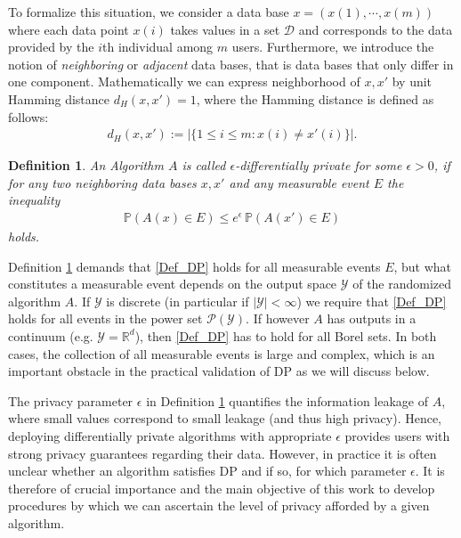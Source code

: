 \documentclass[conference]{IEEEtran}
\newtheorem{definition}{Definition}
\begin{document}
To formalize this situation, we consider a data base $x = (x(1), \cdots, x(m))$ where each data point $x(i)$ takes values in a set $ \mathcal{D}$ and corresponds to the data provided by the $i$th individual among $m$ users. 
Furthermore, we introduce the notion of \textit{neighboring} or \textit{adjacent} data bases, that is data bases that only differ in one component. Mathematically we can express neighborhood of $x,x'$ by unit Hamming distance $d_H(x,x')=1$, where the Hamming distance is defined as follows:
\begin{align*}
d_H(x,x') := \vert \{ 1 \leq i \leq m: x(i) \neq x'(i) \} \vert.
\end{align*}


\begin{definition} \label{def_privacy}
An Algorithm $A$ is called $\epsilon$-differentially private for some $\epsilon>0$, if for any two neighboring data bases $x,x'$ and any measurable event $ E $ the inequality
\begin{align}
\mathbb{P}(A(x) \in E) \leq e^{\epsilon} \, \mathbb{P}(A(x') \in E) \label{Def_DP}
\end{align}
holds.
\end{definition}
Definition \ref{def_privacy} demands that \eqref{Def_DP} holds for all measurable events $E$, but what constitutes a measurable event depends on the output space $\mathcal{Y}$ of the randomized algorithm $A$. If $\mathcal{Y}$ is discrete (in particular if $|\mathcal{Y}|<\infty$) we require that \eqref{Def_DP} holds for all events in the power set $\mathcal{P}(\mathcal{Y})$. If however $A$ has outputs in a continuum (e.g. $\mathcal{Y} = \mathbb{R}
^d$), then \eqref{Def_DP} has to hold for all Borel sets. In both cases, the collection of all measurable events is large and complex, which is an important obstacle in the practical validation of DP as we will discuss below. 

The privacy parameter $ \epsilon$ in Definition \ref{def_privacy} quantifies the information leakage of $A$, where small values correspond to small leakage (and thus high privacy). Hence, deploying differentially private algorithms with appropriate $\epsilon$ provides users with strong privacy guarantees regarding their data. However, in practice it is often unclear whether an algorithm satisfies DP and if so, for which parameter $\epsilon$. It is therefore of crucial importance and the main objective of this work to develop procedures by which we can ascertain the level of privacy afforded by a given algorithm. \\
\end{document}
